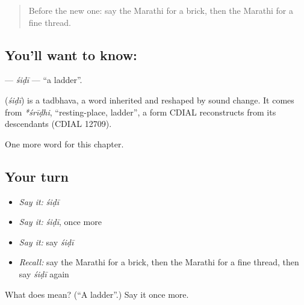 \label{lesson:MR-C242-sidi}



\begin{quote}
Before the new one: say the Marathi for a brick, then the Marathi for a fine thread.
\end{quote}

\subsection*{You'll want to know: }
\textbf{} — \emph{śiḍī} — \textquotedblleft{}a ladder\textquotedblright{}.

\begin{cousinweb}
\textbf{} (\emph{śiḍī}) is a tadbhava, a word inherited and reshaped by sound change. It comes from \emph{*śrīḍhi}, \textquotedblleft{}resting-place, ladder\textquotedblright{}, a form CDIAL reconstructs from its descendants (CDIAL 12709).
\end{cousinweb}

\begin{grammarlens}[title={What you've built}]
One more word for this chapter.
\end{grammarlens}

\subsection*{Your turn}
\begin{itemize}
\raggedright
  \item \emph{Say it:} \emph{śiḍī}
  \item \emph{Say it:} \emph{śiḍī}, once more
  \item \emph{Say it:} say \emph{śiḍī}
  \item \emph{Recall:} say the Marathi for a brick, then the Marathi for a fine thread, then say \emph{śiḍī} again
\end{itemize}

\begin{tcolorbox}[breakable,colback=teal!4,colframe=teal!35!black,title={Before you move on}]
What does  mean? (\textquotedblleft{}A ladder\textquotedblright{}.) Say it once more.
\end{tcolorbox}
